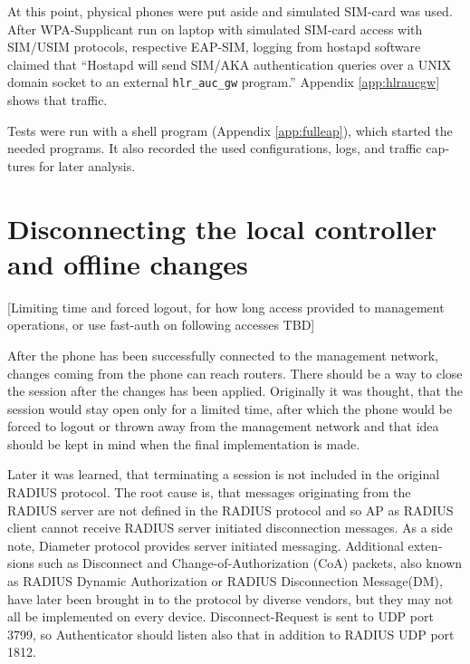 \documentclass[12pt,a4paper,english]{tutthesis}
\begin{document}
\begin{otherlanguage}{english}
At this point, physical phones were put aside and simulated SIM-card
was used.
After WPA-Supplicant run on laptop with simulated SIM-card access 
with SIM/USIM protocols, respective EAP-SIM, logging 
from hostapd software claimed that ``Hostapd will send SIM/AKA authentication
queries over a UNIX domain socket to an external \verb~hlr_auc_gw~ program.''
Appendix \ref{app:hlraucgw}   shows that traffic.

Tests were run with a shell program (Appendix \ref{app:fulleap}), which
started the needed programs. It also recorded the used configurations, logs,
and traffic captures for later analysis.

\section{Disconnecting the local controller and offline changes}
\label{sec-5-3}
\label{sec:disconnections}
[Limiting time and forced logout, for how long access provided to
management operations, or use fast-auth on following accesses TBD]

After the phone has been successfully connected to the management network,
changes coming from 
the phone can reach routers.  There should be a way to close the session after
the changes has been applied. Originally it was thought, that the session
would stay open only for a limited time, after which the phone would be forced to
logout or thrown away from the management network and that idea should be
kept in mind when the final implementation is made.





Later it was learned, that terminating a session is not included in the original RADIUS protocol.
The root cause is, that messages originating from the RADIUS server
are not defined in the RADIUS protocol and so AP as RADIUS client cannot
receive RADIUS server initiated disconnection messages. 
As a side note, Diameter protocol provides server initiated messaging.
Additional
extensions such as Disconnect and Change-of-Authorization (CoA)
packets, also known as RADIUS Dynamic Authorization or RADIUS
Disconnection Message(DM), have later been brought in \cite{rfc5176}
to the protocol by diverse vendors, but they may not all be implemented on
every device.
Disconnect-Request is sent to UDP port 3799, so Authenticator should
listen also that in addition to RADIUS UDP port 1812.







\end{otherlanguage}
\end{document}
